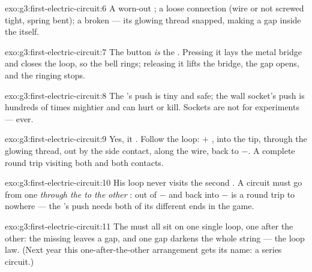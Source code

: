 \begin{solution}{exo:g3:first-electric-circuit:6}
A worn-out ; a loose connection (wire or  not screwed
tight, spring bent); a broken  --- its glowing thread snapped,
making a gap inside the  itself.
\end{solution}

\begin{solution}{exo:g3:first-electric-circuit:7}
The button \emph{is} the . Pressing it lays the metal bridge
and closes the loop, so the bell rings; releasing it lifts the
bridge, the gap opens, and the ringing stops.
\end{solution}

\begin{solution}{exo:g3:first-electric-circuit:8}
The 's push is tiny and safe; the wall socket's push is
hundreds of times mightier and can hurt or kill. Sockets are not for
experiments --- ever.
\end{solution}

\begin{solution}{exo:g3:first-electric-circuit:9}
Yes, it . Follow the loop: $+$ , into the tip, through
the glowing thread, out by the side contact, along the wire, back to
$-$. A complete round trip visiting both  and both
contacts.
\end{solution}

\begin{solution}{exo:g3:first-electric-circuit:10}
His loop never visits the second . A circuit must go from
one  \emph{through the  to the other} : out of
$-$ and back into $-$ is a round trip to nowhere --- the 's
push needs both of its different ends in the game.
\end{solution}

\begin{solution}{exo:g3:first-electric-circuit:11}
The  must all sit on one single loop, one after the other: the
missing  leaves a gap, and one gap darkens the whole string ---
the loop law. (Next year this one-after-the-other arrangement gets
its name: a series circuit.)
\end{solution}

